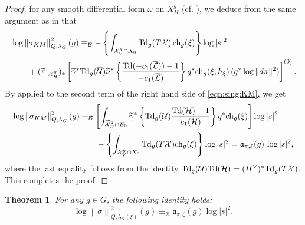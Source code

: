 \documentclass[amscd, leqno]{amsart}
\theoremstyle{plain}
\newtheorem{theorem}{Theorem}[section]
\theoremstyle{definition}
\theoremstyle{remark}
\newenvironment{pf}{\begin{proof}}{\end{proof}}
\begin{document}
\begin{pf}
for any smooth differential form $\omega$ on $X^{g}_{H}$ (cf. \cite{Barlet82}), 
we deduce from the same argument as in \cite[p.74 l.1-l.13]{Yoshikawa07} that
\begin{equation}
\label{eqn:sing:KM}
\begin{aligned}
\,&
\log \left\| \sigma_{KM} \right\|^{2}_{Q,\lambda_{G}}(g) 
\equiv_{\mathcal B}
-\left\{ \int_{{\mathcal X}^{g}_{V}\cap X_{0}}{\rm Td}_{g}(T{\mathcal X})\,{\rm ch}_{g}(\xi) \right\} \log|s|^{2}
\\
&
\qquad+
(\widetilde{\pi}|_{{\mathcal X}^{g}_{H}})_{*}
\left[ 
\widetilde{\gamma}^{*} {\rm Td}_{g}( \overline{\mathcal U} ) 
\widetilde{\nu}^{*} \left\{ 
\frac{{\rm Td}(-c_{1}(\overline{\mathcal L}))-1}{-c_{1}(\overline{\mathcal L})} \right\} q^{*}{\rm ch}_{g}(\xi,h_{\xi})\,(q^{*}\log\|d\pi\|^{2})
\right]^{(0)}.
\end{aligned}
\end{equation}
By \cite[Cor.\,4.6]{Yoshikawa07} applied to the second term of the right hand side of \eqref{eqn:sing:KM}, we get
$$
\begin{aligned}
\log \left\| \sigma_{KM} \right\|^{2}_{Q,\lambda_{G}}(g)
&\equiv_{\mathcal B}
\left[
\int_{\widetilde{\mathcal X}^{g}_{H}\cap E_{0}}
\widetilde{\gamma}^{*} \left\{ {\rm Td}_{g}({\mathcal U}) \frac{{\rm Td}({\mathcal H})-1}{c_{1}({\mathcal H})} \right\} q^{*}{\rm ch}_{g}(\xi)
\right]
\log|s|^{2}
\\
&\qquad
-\left\{ \int_{{\mathcal X}^{g}_{V}\cap X_{0}} {\rm Td}_{g}( T{\mathcal X} ) {\rm ch}_{g}( \xi ) \right\} \log|s|^{2}
=
{\mathfrak a}_{\pi, \xi}(g)\,\log | s |^{2},
\end{aligned}
$$
where the last equality follows from the identity ${\rm Td}_{g}({\mathcal U}) {\rm Td}({\mathcal H}) = (\varPi^{\lor})^{*}{\rm Td}_{g}(T{\mathcal X})$.
This completes the proof.
\end{pf}


\begin{theorem}
\label{Theorem1.1}
For any $g\in G$, the following identity holds:
$$
\log \left\| \sigma \right\|^{2}_{Q,\lambda_{G}(\xi)}(g) \equiv_{{\mathcal B}} {\mathfrak a}_{\pi, \xi}(g) \log | s |^{2}.
$$
\end{theorem}
\end{document}
